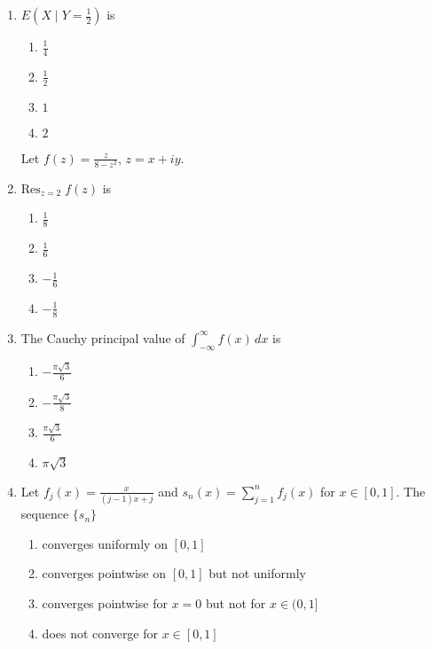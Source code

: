 \documentclass[journal,12pt,onecolumn]{IEEEtran}
\theoremstyle{remark}
\begin{document}
\begin{enumerate}
    	\item $E\left( X \mid Y = \frac{1}{2} \right)$ is
    	\begin{multicols}{4}
    	\begin{enumerate}
    		\item $\frac{1}{4}$
    		\item $\frac{1}{2}$
    		\item $1$
    		\item $2$
    	\end{enumerate}
    	\end{multicols}
    	Let $f(z) = \frac{z}{8 - z^2}$, $z = x + iy$. \\
    	\item $\text{Res}_{z=2} \; f(z)$ is
    	\begin{multicols}{4}
    	\begin{enumerate}
    		\item $\frac{1}{8}$
    		\item $\frac{1}{6}$
    		\item $-\frac{1}{6}$
    		\item $-\frac{1}{8}$
    	\end{enumerate}
    	\end{multicols}
    	\item The Cauchy principal value of $\int_{-\infty}^{\infty} f(x) \, dx$ is
    	\begin{multicols}{4}
    	\begin{enumerate}
    		\item $-\frac{\pi \sqrt{3}}{6}$
    		\item $-\frac{\pi \sqrt{3}}{8}$
    		\item $\frac{\pi \sqrt{3}}{6}$
    		\item $\pi \sqrt{3}$
    	\end{enumerate}
    	\end{multicols}
    	\item Let $f_j(x) = \frac{x}{(j-1)x + j}$ and $s_n(x) = \sum_{j=1}^n f_j(x)$ for $x \in [0,1]$. The sequence $\{s_n\}$
    	\begin{enumerate}
    		\item converges uniformly on $[0,1]$
    		\item converges pointwise on $[0,1]$ but not uniformly
    		\item converges pointwise for $x = 0$ but not for $x \in (0, 1]$
    		\item does not converge for $x \in [0, 1]$
    	\end{enumerate}

\end{enumerate}
\end{document}
